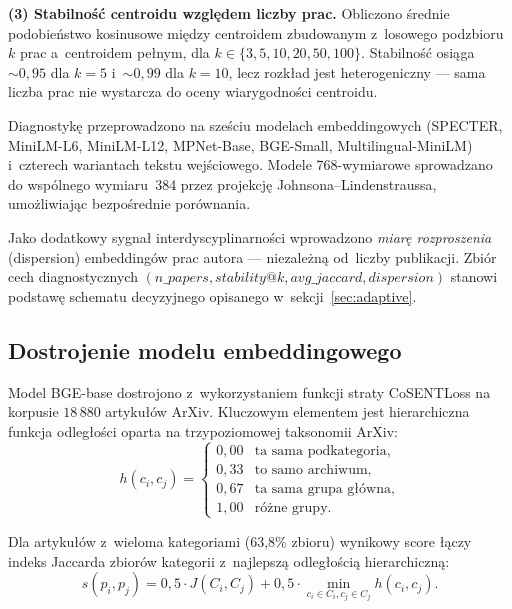 \documentclass[a4paper,11pt,twocolumn]{article}
\begin{document}
\textbf{(3) Stabilność centroidu względem liczby prac.}
Obliczono średnie podobieństwo kosinusowe między centroidem zbudowanym
z~losowego podzbioru $k$ prac a~centroidem pełnym, dla
$k \in \{3, 5, 10, 20, 50, 100\}$. Stabilność osiąga $\sim\!0{,}95$
dla $k=5$ i~$\sim\!0{,}99$ dla $k=10$, lecz rozkład jest heterogeniczny
--- sama liczba prac nie wystarcza do oceny wiarygodności centroidu.

Diagnostykę przeprowadzono na sześciu modelach embeddingowych (SPECTER,
MiniLM-L6, MiniLM-L12, MPNet-Base, BGE-Small, Multilingual-MiniLM)
i~czterech wariantach tekstu wejściowego. Modele 768-wymiarowe
sprowadzano do wspólnego wymiaru~384 przez projekcję
Johnsona--Lindenstraussa, umożliwiając bezpośrednie porównania.

Jako dodatkowy sygnał interdyscyplinarności wprowadzono \emph{miarę
rozproszenia} (dispersion) embeddingów prac autora --- niezależną
od~liczby publikacji. Zbiór cech diagnostycznych
$(n\_papers, stability@k, avg\_jaccard, dispersion)$ stanowi podstawę
schematu decyzyjnego opisanego w~sekcji~\ref{sec:adaptive}.

\subsection{Dostrojenie modelu embeddingowego}
\label{sec:finetune}

Model BGE-base dostrojono z~wykorzystaniem funkcji straty CoSENTLoss
na korpusie $18\,880$ artykułów ArXiv. Kluczowym elementem jest
hierarchiczna funkcja odległości oparta na trzypoziomowej taksonomii
ArXiv:
\begin{equation}
  h(c_i, c_j) = \begin{cases}
    0{,}00 & \text{ta sama podkategoria,} \\
    0{,}33 & \text{to samo archiwum,} \\
    0{,}67 & \text{ta sama grupa główna,} \\
    1{,}00 & \text{różne grupy.}
  \end{cases}
  \label{eq:hierarchy}
\end{equation}

Dla artykułów z~wieloma kategoriami (63,8\% zbioru) wynikowy score
łączy indeks Jaccarda zbiorów kategorii z~najlepszą odległością
hierarchiczną:
\begin{equation}
  s(p_i, p_j) = 0{,}5 \cdot J(C_i, C_j) + 0{,}5 \cdot
  \min_{c_i \in C_i, c_j \in C_j} h(c_i, c_j).
  \label{eq:score}
\end{equation}
\end{document}
